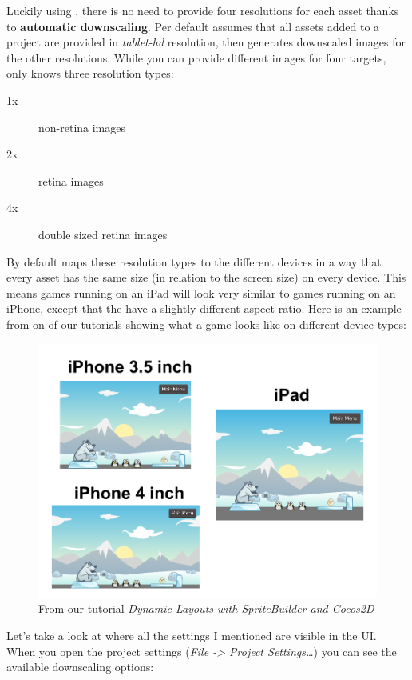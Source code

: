 Luckily using \SB{}, there is no need to provide four resolutions for each asset
thanks to \textbf{automatic downscaling}.
Per default \SB{} assumes that all assets added to a project are provided in \textit{tablet-hd} resolution, then
\SB{} generates downscaled images for the other resolutions. While you can
provide different images for four targets, \SB{} only knows three resolution
types:
\begin{description}
\item[1x] non-retina images
\item[2x] retina images
\item[4x] double sized retina images
\end{description}

By default \SB{} maps these resolution types to the different devices in a way
that every asset has the same size (in relation to the screen size) on every
device. This means games running on an iPad will look very similar to games
running on an iPhone, except that the have a slightly different aspect ratio.
Here is an example from on of our tutorials showing what a game looks like on
different device types:

\begin{figure}[H]
		\centering
		\includegraphics[width=0.9\linewidth]{images/Chapter2/ResultsFlexibleScaleMode.png}
		\caption{From our tutorial \textit{Dynamic Layouts with SpriteBuilder and
		Cocos2D}}
\end{figure}

Let's take a look at where all the settings I mentioned are visible in the \SB{}
UI. When you open the project settings (\textit{File -> Project Settings\ldots})
you can see the available downscaling options:

